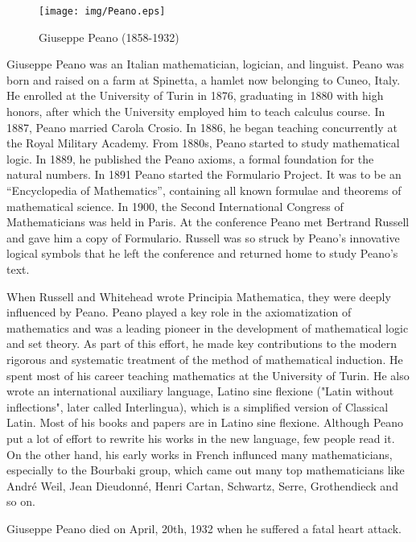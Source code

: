 \documentclass[UTF8]{article}
\begin{document}
\begin{figure}[htbp]
 \centering
 \texttt{[image: img/Peano.eps]}
 \caption{Giuseppe Peano (1858-1932)}
 \label{fig:Peano}
\end{figure}

Giuseppe Peano was an Italian mathematician, logician, and linguist. Peano was born and raised on a farm at Spinetta, a hamlet now belonging to Cuneo, Italy. He enrolled at the University of Turin in 1876, graduating in 1880 with high honors, after which the University employed him to teach calculus course. In 1887, Peano married Carola Crosio. In 1886, he began teaching concurrently at the Royal Military Academy. From 1880s, Peano started to study mathematical logic. In 1889, he published the Peano axioms, a formal foundation for the natural numbers. In 1891 Peano started the Formulario Project. It was to be an ``Encyclopedia of Mathematics'', containing all known formulae and theorems of mathematical science. In 1900, the Second International Congress of Mathematicians was held in Paris. At the conference Peano met Bertrand Russell and gave him a copy of Formulario. Russell was so struck by Peano's innovative logical symbols that he left the conference and returned home to study Peano's text\cite{M-Kline-2007}.

When Russell and Whitehead wrote Principia Mathematica, they were deeply influenced by Peano. Peano played a key role in the axiomatization of mathematics and was a leading pioneer in the development of mathematical logic and set theory. As part of this effort, he made key contributions to the modern rigorous and systematic treatment of the method of mathematical induction. He spent most of his career teaching mathematics at the University of Turin. He also wrote an international auxiliary language, Latino sine flexione ("Latin without inflections", later called Interlingua), which is a simplified version of Classical Latin. Most of his books and papers are in Latino sine flexione. Although Peano put a lot of effort to rewrite his works in the new language, few people read it. On the other hand, his early works in French influnced many mathematicians, especially to the Bourbaki group, which came out many top mathematicians like André Weil, Jean Dieudonné, Henri Cartan, Schwartz, Serre, Grothendieck and so on.

Giuseppe Peano died on April, 20th, 1932 when he suffered a fatal heart attack.
\end{document}
